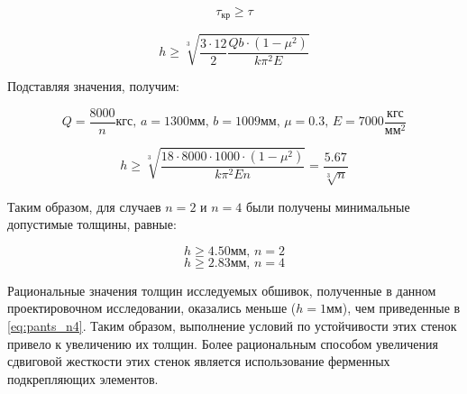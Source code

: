 \begin{equation}
\tau_\text{кр} \geq \tau  
\end{equation}

\begin{equation}
h \geq \sqrt[3]{\frac{3\cdot12}{2}\frac{Qb\cdot(1-\mu^2)}{k\pi^2E}}
\end{equation}

Подставляя значения, получим:

\begin{equation}
Q=\frac{8000}{n}\text{кгс},\,a=1300\text{мм},\,b=1009\text{мм},\,\mu=0.3,\,E=7000\frac{\text{кгс}}{\text{мм}^2}
\end{equation}

\begin{equation}
h \geq \sqrt[3]{\frac{18\cdot8000\cdot1000\cdot(1-\mu^2)}{k\pi^2En}} = \frac{5.67}{\sqrt[3]{n}} 
\end{equation}

Таким образом, для случаев $n = 2$ и $n = 4$  были получены минимальные допустимые толщины, 
равные:

\begin{equation}
h\geq4.50\text{мм},\,n=2
\end{equation}
\begin{equation}
h\geq2.83\text{мм},\,n=4
\label{eq:pants_n4}
\end{equation}

Рациональные значения толщин исследуемых обшивок, полученные в данном проектировочном исследовании, оказались меньше ($h = 1\text{мм}$), чем приведенные в \ref{eq:pants_n4}. Таким образом, выполнение условий по устойчивости этих стенок привело к увеличению их толщин. Более рациональным способом увеличения сдвиговой жесткости этих стенок является использование ферменных подкрепляющих элементов.
